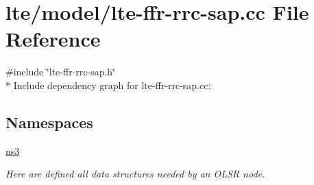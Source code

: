 \hypertarget{lte-ffr-rrc-sap_8cc}{}\section{lte/model/lte-\/ffr-\/rrc-\/sap.cc File Reference}
\label{lte-ffr-rrc-sap_8cc}
{\ttfamily \#include \char`\"{}lte-\/ffr-\/rrc-\/sap.\+h\char`\"{}}\\*
Include dependency graph for lte-\/ffr-\/rrc-\/sap.cc\+:
\subsection*{Namespaces}
\begin{DoxyCompactItemize}
\item 
 \hyperlink{namespacens3}{ns3}
\begin{DoxyCompactList}\small\item\em Here are defined all data structures needed by an O\+L\+SR node. \end{DoxyCompactList}\end{DoxyCompactItemize}
